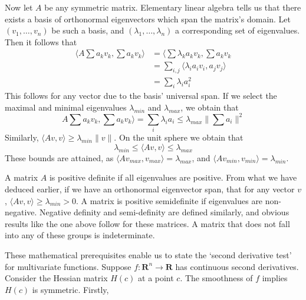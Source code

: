 \documentclass[12pt]{amsbook}
\theoremstyle{plain}
\theoremstyle{definition}
\begin{document}
Now let $A$ be any symmetric matrix. Elementary linear algebra tells us that there exists a basis of orthonormal eigenvectors which span the matrix's domain. Let $(v_1, \dots, v_n)$ be such a basis, and $(\lambda_1, \dots, \lambda_n)$ a corresponding set of eigenvalues. Then it follows that
%
\begin{align*}
    \langle A \sum a_k v_k, \sum a_k v_k \rangle &= \langle \sum \lambda_k a_k v_k, \sum a_k v_k\\
    &= \sum_{i,j} \langle \lambda_i a_i v_i, a_j v_j \rangle\\
    &= \sum_i \lambda_i a_i^2
\end{align*}
%
This follows for any vector due to the basis' universal span. If we select the maximal and minimal eigenvalues $\lambda_{min}$ and $\lambda_{max}$, we obtain that
%
\[ A \sum a_k v_k, \sum a_k v_k \rangle = \sum_i \lambda_i a_i \leq \lambda_{max} \| \sum a_i \|^2 \]
%
Similarly, $\langle Av, v \rangle \geq \lambda_{min} \|v\|$. On the unit sphere we obtain that
%
\[ \lambda_{min} \leq \langle Av, v \rangle \leq \lambda_{max} \]
%
These bounds are attained, as $\langle Av_{max}, v_{max} \rangle = \lambda_{max}$, and $\langle Av_{min}, v_{min} \rangle = \lambda_{min}$.

A matrix $A$ is positive definite if all eigenvalues are positive. From what we have deduced earlier, if we have an orthonormal eigenvector span, that for any vector $v$, $\langle Av, v \rangle \geq \lambda_{min} > 0$. A matrix is positive semidefinite if eigenvalues are non-negative. Negative definity and semi-definity are defined similarly, and obvious results like the one above follow for these matrices. A matrix that does not fall into any of these groups is indeterminate.

These mathematical prerequisites enable us to state the `second derivative test' for multivariate functions. Suppose $f:\mathbf{R}^n \to \mathbf{R}$ has continuous second derivatives. Consider the Hessian matrix $H(c)$ at a point $c$. The smoothness of $f$ implies $H(c)$ is symmetric. Firstly,
\end{document}
